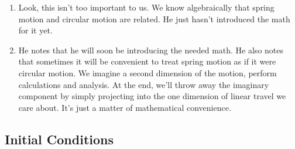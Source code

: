 \begin{enumerate}
  \item Look, this isn't too important to us. We know algebraically that
  spring motion and circular motion are related. He just hasn't
  introduced the math for it yet.

  \item He notes that he will soon be introducing the needed math. He
  also notes that sometimes it will be convenient to treat spring motion
  as if it were circular motion. We imagine a second dimension of the
  motion, perform calculations and analysis. At the end, we'll throw
  away the imaginary component by simply projecting into the one
  dimension of linear travel we care about. It's just a matter of
  mathematical convenience.
\end{enumerate}

\subsection{Initial Conditions}

